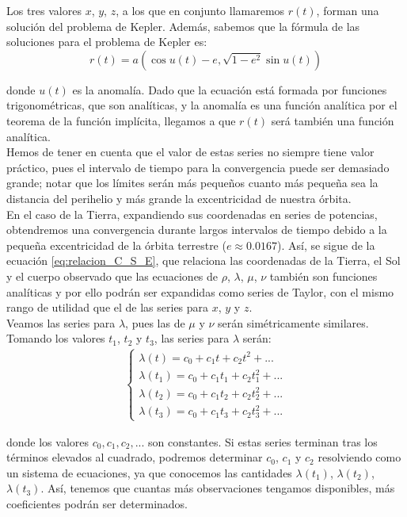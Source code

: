 \documentclass[11pt]{book}
\begin{document}
Los tres valores $x$, $y$, $z$, a los que en conjunto llamaremos $r(t)$, forman una solución del problema de Kepler. Además, sabemos que la fórmula de las soluciones para el problema de Kepler es:
\[
r(t)=a(\cos{u(t)}-e,\sqrt{1-e^2}\sin{u(t)})
\]

\noindent donde $u(t)$ es la anomalía. Dado que la ecuación está formada por funciones trigonométricas, que son analíticas, y la anomalía es una función analítica por el teorema de la función implícita, llegamos a que $r(t)$ será también una función analítica.\\

Hemos de tener en cuenta que el valor de estas series no siempre tiene valor práctico, pues el intervalo de tiempo para la convergencia puede ser demasiado grande; notar que los límites serán más pequeños cuanto más pequeña sea la distancia del perihelio y más grande la excentricidad de nuestra órbita.\\

En el caso de la Tierra, expandiendo sus coordenadas en series de potencias, obtendremos una convergencia durante largos intervalos de tiempo debido a la pequeña excentricidad de la órbita terrestre ($e\approx0.0167$). Así, se sigue de la ecuación \eqref{eq:relacion_C_S_E}, que relaciona las coordenadas de la Tierra, el Sol y el cuerpo observado que las ecuaciones de $\rho$, $\lambda$, $\mu$, $\nu$ también son funciones analíticas y por ello podrán ser expandidas como series de Taylor, con el mismo rango de utilidad que el de las series para $x$, $y$ y $z$.\\

Veamos las series para $\lambda$, pues las de $\mu$ y $\nu$ serán simétricamente similares. Tomando los valores $t_1$, $t_2$ y $t_3$, las series para $\lambda$ serán:
\begin{align}
\left\{
\begin{array}{l}
	\lambda(t)=c_0+c_1t+c_2t^2+...\\
	\lambda(t_1)=c_0+c_1t_1+c_2t_1^2+...\\
	\lambda(t_2)=c_0+c_1t_2+c_2t_2^2+...\\
	\lambda(t_3)=c_0+c_1t_3+c_2t_3^2+...
\end{array}
\right.
\label{eq:series_lambda}
\end{align}

\noindent donde los valores $c_0, c_1, c_2, ...$ son constantes. Si estas series terminan tras los términos elevados al cuadrado, podremos determinar $c_0$, $c_1$ y $c_2$ resolviendo como un sistema de ecuaciones, ya que conocemos las cantidades $\lambda(t_1)$, $\lambda(t_2)$, $\lambda(t_3)$. Así, tenemos que cuantas más observaciones tengamos disponibles, más coeficientes podrán ser determinados.\\
\end{document}
